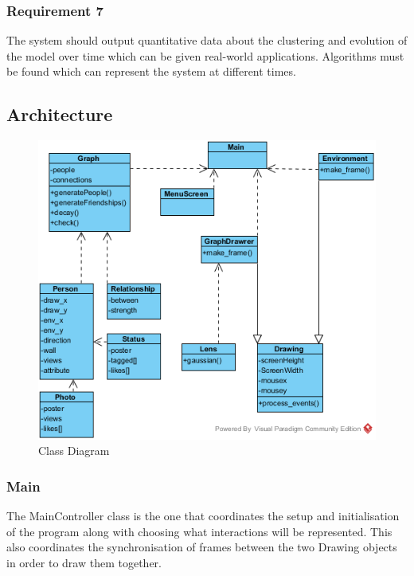 \documentclass[12pt,a4paper]{article}
\begin{document}
\subsubsection{Requirement 7}
The system should output quantitative data about the clustering and evolution of the model over time which can be given real-world applications. Algorithms must be found which can represent the system at different times.

\subsection{Architecture}

\begin{figure}[htb]
\begin{center}
\caption{Class Diagram}
\label{fig:class}
\includegraphics[width=6in]{Classpng}
\end{center}
\end{figure}

\subsubsection{Main}
The MainController class is the one that coordinates the setup and initialisation of the program along with choosing what interactions will be represented. This also coordinates the synchronisation of frames between the two Drawing objects in order to draw them together.
\end{document}

